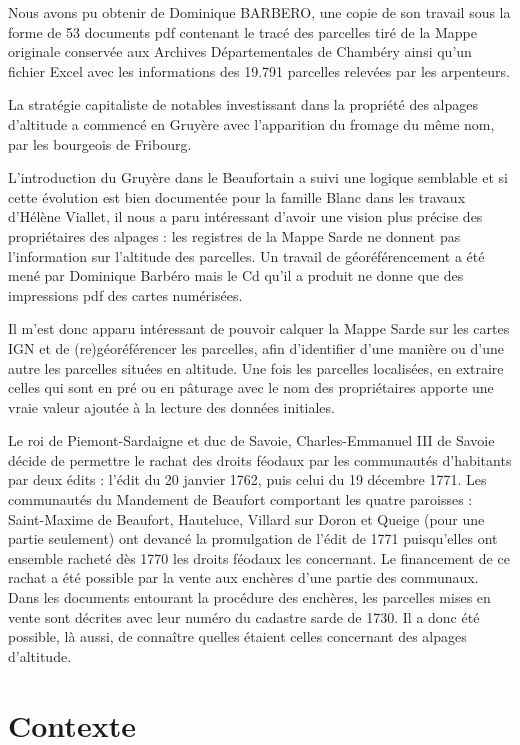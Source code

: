 \documentclass[12pt,a4paper]{report}
\begin{document}
Nous avons  pu obtenir de Dominique BARBERO, une copie de son travail sous la forme de 53 documents pdf contenant le tracé des parcelles tiré de la Mappe originale conservée aux Archives Départementales de Chambéry ainsi qu'un fichier Excel avec les informations des 19.791 parcelles relevées par les arpenteurs.

\vspace{1em}
La stratégie capitaliste de notables investissant dans la propriété des alpages d'altitude a commencé  en Gruyère avec l'apparition du fromage du même nom, par les bourgeois de Fribourg.

L'introduction du Gruyère dans le Beaufortain a suivi une logique semblable et si cette évolution est bien documentée pour la famille Blanc dans les travaux d'Hélène Viallet, il nous a paru intéressant d'avoir une vision plus précise des propriétaires des alpages : les registres de la Mappe Sarde ne donnent pas l'information sur l'altitude des parcelles. Un travail de géoréférencement a été mené par Dominique Barbéro mais le Cd qu'il a produit ne donne que des impressions pdf des cartes numérisées. 

Il m'est donc apparu intéressant de pouvoir calquer la Mappe Sarde sur les cartes IGN et de (re)géoréférencer les parcelles, afin d'identifier d'une manière ou d'une autre les parcelles situées en altitude. Une fois les parcelles localisées, en extraire celles qui sont en pré ou en pâturage avec le nom des propriétaires apporte une vraie valeur ajoutée à la lecture des données initiales.

Le roi de Piemont-Sardaigne et duc de Savoie, Charles-Emmanuel III de Savoie décide de permettre le rachat des droits féodaux par les communautés d’habitants par deux édits : l’édit du 20 janvier 1762, puis celui du 19 décembre 1771. Les communautés du Mandement de Beaufort comportant les quatre paroisses : Saint-Maxime de Beaufort, Hauteluce, Villard sur Doron et Queige (pour une partie seulement) ont devancé la promulgation de l'édit de 1771 puisqu'elles ont ensemble racheté dès 1770 les droits féodaux les concernant. Le financement de ce rachat a été possible par la vente aux enchères d'une partie des communaux. Dans les documents entourant la procédure des enchères, les parcelles mises en vente sont décrites avec leur numéro du cadastre sarde de 1730. Il a donc été possible, là aussi, de connaître quelles étaient celles concernant des alpages d'altitude.  


	
\chapter{Contexte}
\end{document}
